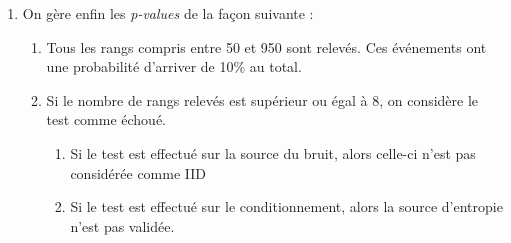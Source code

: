 \begin{enumerate}
\item On gère enfin les \textit{p-values} de la façon suivante : 
	\begin{enumerate}
	\item Tous les rangs compris entre 50 et 950 sont relevés. Ces événements ont une probabilité d'arriver de 10\% au total. 
	\item Si le nombre de rangs relevés est supérieur ou égal à 8, on considère le test comme échoué.
		\begin{enumerate}
		\item Si le test est effectué sur la source du bruit, alors celle-ci n'est pas considérée comme IID
		\item Si le test est effectué sur le conditionnement, alors  la source d'entropie n'est pas validée.
		\end{enumerate}
	\end{enumerate}
\end{enumerate}

